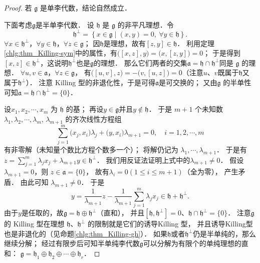 \begin{proof}
    若 $\mathfrak{g}$ 是单李代数，结论自然成立．
    
    下面考虑$\mathfrak{g}$是半单李代数．
    设 $\mathfrak{h}$ 是 $\mathfrak{g}$ 的非平凡理想．令
    \begin{equation}\label{chlg:eqn_h-perp}
        \mathfrak{h}^{\perp}=\left\{x \in \mathfrak{g} \mid (x, y)=0,\ \forall y \in \mathfrak{h}\right\} .
    \end{equation}
    $\forall x \in \mathfrak{h}^{\perp}$，$\forall y \in \mathfrak{h}$，$\forall z \in \mathfrak{g}$；
    因$\mathfrak{h}$是理想，故有$[z, y]\in \mathfrak{h}$．
    利用定理\ref{chlg:thm_Killing-sym}中的属性，有$\bigl([x, z], y\bigr)=\bigl(x,[z, y]\bigr)=0$；
    于是得到$[x, z]\in \mathfrak{h}^\perp$，这说明$\mathfrak{h}^\perp$也是$\mathfrak{g}$的理想．
    那么它们两者的交集$\mathfrak{a}=\mathfrak{h} \cap \mathfrak{h}^{\perp}$同是 $\mathfrak{g}$ 的理想．
    $\forall u, v \in \mathfrak{a}$，$\forall z \in \mathfrak{g}$，
    有$\bigl([u, v], z\bigr)=-\bigl(v,[u, z]\bigr)=0$（注意$u$、$v$既属于$\mathfrak{h}$又
    属于$\mathfrak{h}^{\perp}$）．
    注意 Killing 型的非退化性，于是可得$\mathfrak{a}$是可交换的；
    又由$\mathfrak{g}$ 的半单性可知$\mathfrak{a}=\mathfrak{h} \cap \mathfrak{h}^{\perp}=\{0\}$．
    
    
    设$x_1, x_2, \cdots, x_m$ 为 $\mathfrak{h}$ 的基；
    再设$y \in \mathfrak{g}$并且$ y \notin \mathfrak{h}$．
    于是 $m+1$ 个未知数 $\lambda_1, \lambda_2, \cdots, \lambda_m$, $\lambda_{m+1}$ 的齐次线性方程组
    \begin{equation}
        \sum_{j=1}^m \bigl(x_j, x_i\bigr) \lambda_j+ \bigl(y, x_i\bigr) \lambda_{m+1}=0, \quad i=1,2, \cdots, m
    \end{equation}
    有{\kaishu 非零解}（未知量个数比方程个数多一个）；
    将解仍记为 $\lambda_1, \cdots,  \lambda_{m+1}$．
    于是有$z=\sum_{j=1}^m \lambda_j x_j+\lambda_{m+1} y \in \mathfrak{h}^{\perp} $．
    我们用反证法证明上式中的$\lambda_{m+1} \neq 0$．
    假设$\lambda_{m+1}=0$，则 $z \in \mathfrak{a}=\{0\}$，
    故有$\lambda_i=0 (1 \leqslant i \leqslant m+1)$（全为零）， 产生矛盾．
    由此可知 $\lambda_{m+1} \neq 0$． 于是
    \begin{equation}
        y=\frac{1}{\lambda_{m+1}} z-\frac{1}{\lambda_{m+1}} \sum_{j=1}^m \lambda_j x_j \in \mathfrak{h}+\mathfrak{h}^{\perp} .
    \end{equation}
    由于$y$是任取的，故$\mathfrak{g}=\mathfrak{h} \oplus \mathfrak{h}^{\perp}$（直和），
    并且$[\mathfrak{h} , \mathfrak{h}^{\perp}]=0$、$\mathfrak{h} \cap \mathfrak{h}^{\perp}=\{0\}$．
    注意$\mathfrak{g}$ 的 Killing 型在理想 $\mathfrak{h}$、$ \mathfrak{h}^{\perp}$ 的限制就是它们的诱导Killing 型，
    并且诱导Killing型也是非退化的（见命题\ref{chlg:thm_Killing-gh}）． %
    如果$\mathfrak{h}$或者$ \mathfrak{h}^{\perp}$仍是半单纯的，那么继续分解；
    经过有限步后可知半单纯李代数$\mathfrak{g}$可以分解为有限个的单纯理想的直和：
    $\mathfrak{g}=\mathfrak{h}_1 \oplus \mathfrak{h}_2 \oplus \cdots \oplus \mathfrak{h}_r$．
    

\end{proof}
